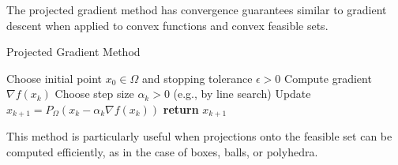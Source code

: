 The projected gradient method has convergence guarantees similar to gradient descent when applied to convex functions and convex feasible sets.

\begin{algorithm}[H]
    \caption{Projected Gradient Method}
    \begin{algorithmic}[1]
        \State Choose initial point $x_0 \in \Omega$ and stopping tolerance $\epsilon > 0$
            \State Compute gradient $\nabla f(x_k)$
            \State Choose step size $\alpha_k > 0$ (e.g., by line search)
            \State Update $x_{k+1} = P_\Omega(x_k - \alpha_k \nabla f(x_k))$
                \State \textbf{return} $x_{k+1}$
            \EndIf
        \EndFor
    \end{algorithmic}
\end{algorithm}

This method is particularly useful when projections onto the feasible set can be computed efficiently, as in the case of boxes, balls, or polyhedra.
